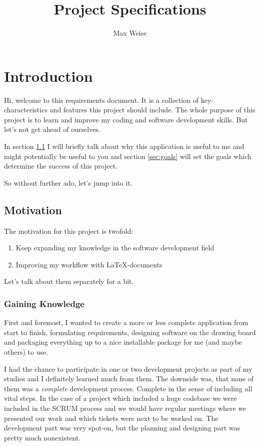 \documentclass[a4paper, draft, 12pt]{scrartcl}
\title{Project Specifications}
\author{Max Weise}
\begin{document}
\maketitle
\tableofcontents

\section{Introduction}
Hi, welcome to this requirements document. It is a collection of
key-characteristics and features this project should include. The whole purpose
of this project is to learn and improve my coding and software development
skills. But let's not get ahead of ourselves.

In section \ref{sec:motivation} I will briefly talk about why this application
is useful to me and might potentially be useful to you and section
\ref{sec:goals} will set the goals which determine the success of this project.

So without further ado, let's jump into it.


\subsection{Motivation}\label{sec:motivation}
The motivation for this project is twofold:

\begin{enumerate}
    \item Keep expanding my knowledge in the software development field
    \item Improving my workflow with {\LaTeX}-documents
\end{enumerate}

Let's talk about them separately for a bit.

\subsubsection*{Gaining Knowledge}
First and foremost, I wanted to create a more or less complete application from
start to {\glqq finish\grqq}, formulating requirements, designing software on
the drawing board and packaging everything up to a nice installable package for
me (and maybe others) to use.

I had the chance to participate in one or two development projects as part of
my studies and I definitely learned much from them. The downside was, that none
of them was a \emph{complete} development process. Complete in the sense of
including all vital steps. In the case of a project which included a huge
codebase we were included in the SCRUM process and we would have regular
meetings where we presented our work and which tickets were next to be worked
on. The development part was very spot-on, but the planning and designing part
was pretty much nonexistent.
\end{document}
